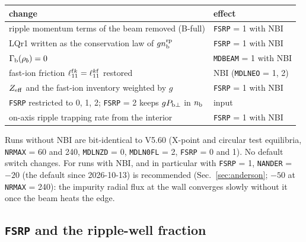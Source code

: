\documentclass[11pt]{article}
\def\r#1{{\rm#1}}
\def\nb{n_\r{b}}
\def\nbrp{n_\r{b}^\r{rp}}
\begin{document}
\begin{center}
\begin{tabular}{|l|l|}\hline
change & effect \\\hline
ripple momentum terms of the beam removed (B-full) & \texttt{FSRP} = 1 with NBI \\
LQr1 written as the conservation law of $g\nbrp$ & \texttt{FSRP} = 1 with NBI \\
$\Gamma_\r{b}(\rho_b) = 0$ & \texttt{MDBEAM} = 1 with NBI \\
fast-ion friction $\ell_{11}^{\r{f}k} = \ell_{11}^{k\r{f}}$ restored & NBI (\texttt{MDLNEO} = 1, 2) \\
$Z_\r{eff}$ and the fast-ion inventory weighted by $g$ & \texttt{FSRP} = 1 with NBI \\
\texttt{FSRP} restricted to 0, 1, 2; \texttt{FSRP} = 2 keeps $g P_{\r{b}\perp}$ in $\nb$ & input \\
on-axis ripple trapping rate from the interior & \texttt{FSRP} = 1 with NBI \\\hline
\end{tabular}
\end{center}

Runs without NBI are bit-identical to V5.60 (X-point and circular test
equilibria, \texttt{NRMAX} = 60 and 240, \texttt{MDLNZD} = 0, \texttt{MDLN0FL} = 2,
\texttt{FSRP} = 0 and 1).  No default switch changes.  For runs with NBI, and in
particular with \texttt{FSRP} = 1, \texttt{NANDER} = $-20$ (the default since 2026-10-13) is recommended
(Sec.~\ref{sec:anderson}; $-50$ at \texttt{NRMAX} = 240): the impurity radial flux at the
wall converges slowly without it once the beam heats the edge.

\subsection{\texttt{FSRP} and the ripple-well fraction}
\end{document}
